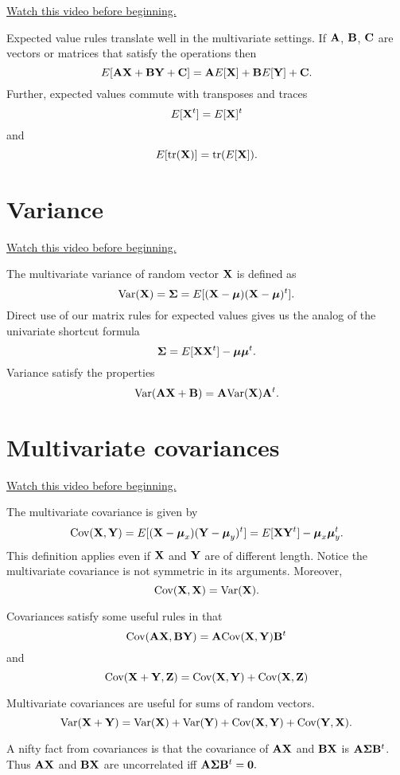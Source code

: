 \href{https://www.youtube.com/watch?v=GgNUixhQ6oI&list=PLpl-gQkQivXhdgUCdaUQcdb31CRe8Mm2y&index=39}{Watch this video before beginning.}

Expected value rules translate well in the multivariate settings.
If $\mathbf{A}$, $\mathbf{B}$, $\mathbf{C}$ are vectors or matrices that satisfy the operations then 
$$
E[\mathbf{A} \mathbf{X} + \mathbf{B} \mathbf{Y} + \mathbf{C}] = \mathbf{A} E[\mathbf{X}] + \mathbf{B} E[\mathbf{Y}] + \mathbf{C}.
$$
Further, expected values commute with transposes and traces
$$
E[\mathbf{X}^t] = E[\mathbf{X}]^t
$$
and 
$$
E[\mbox{tr}(\mathbf{X})] = \mbox{tr}(E[\mathbf{X}]).
$$

\section{Variance}

\href{https://www.youtube.com/watch?v=Z5L0dU6Chmc&index=40&list=PLpl-gQkQivXhdgUCdaUQcdb31CRe8Mm2y}{Watch this video before beginning.}

The multivariate variance of random vector $\mathbf{X}$ is defined as 
$$
\mbox{Var}(\mathbf{X}) = \boldsymbol{\Sigma} = E[(\mathbf{X} - \boldsymbol{\mu})(\mathbf{X} - \boldsymbol{\mu})^t].
$$
Direct use of our matrix rules for expected values gives us the
analog of the univariate shortcut formula
$$
\boldsymbol{\Sigma} = E[\mathbf{X}\mathbf{X}^t] - \boldsymbol{\mu} \boldsymbol{\mu}^t.
$$
Variance satisfy the properties 
$$
\mbox{Var}(\mathbf{A} \mathbf{X} + \mathbf{B}) = \mathbf{A} \mbox{Var}(\mathbf{X}) \mathbf{A}^t.
$$

\section{Multivariate covariances}

\href{https://www.youtube.com/watch?v=mddVO0zW64U&index=41&list=PLpl-gQkQivXhdgUCdaUQcdb31CRe8Mm2y}{Watch this video before beginning.}

The multivariate covariance is given by 
$$
\mbox{Cov}(\mathbf{X}, \mathbf{Y}) = E[(\mathbf{X} - \boldsymbol{\mu}_x)(\mathbf{Y} - \boldsymbol{\mu}_y)^t]
= E[\mathbf{X} \mathbf{Y}^t] - \boldsymbol{\mu}_x \boldsymbol{\mu}_y^t.
$$
This definition applies even if $\mathbf{X}$ and $\mathbf{Y}$ are of different length.
Notice the multivariate covariance is not symmetric in its arguments. 
Moreover, 
$$
\mbox{Cov}(\mathbf{X}, \mathbf{X}) = \mbox{Var}(\mathbf{X}).
$$

Covariances satisfy some useful rules in that
$$
\mbox{Cov}(\mathbf{A} \mathbf{X}, \mathbf{B} \mathbf{Y}) = \mathbf{A} \mbox{Cov}(\mathbf{X}, \mathbf{Y}) \mathbf{B}^t
$$
and
$$
\mbox{Cov}(\mathbf{X} + \mathbf{Y}, \mathbf{Z}) = \mbox{Cov}(\mathbf{X}, \mathbf{Y}) + \mbox{Cov}(\mathbf{X}, \mathbf{Z})
$$

Multivariate covariances are useful for sums of random vectors. 
$$
\mbox{Var}(\mathbf{X} + \mathbf{Y}) = \mbox{Var}(\mathbf{X}) + \mbox{Var}(\mathbf{Y}) + \mbox{Cov}(\mathbf{X}, \mathbf{Y}) + \mbox{Cov}(\mathbf{Y}, \mathbf{X}).
$$

A nifty fact from covariances is that the covariance of $\mathbf{A} \mathbf{X}$ and
$\mathbf{B} \mathbf{X}$ is $\mathbf{A} \boldsymbol{\Sigma} \mathbf{B}^t$. Thus $\mathbf{A} \mathbf{X}$ and $\mathbf{B} \mathbf{X}$ 
are uncorrelated iff $\mathbf{A} \boldsymbol{\Sigma} \mathbf{B}^t = \mathbf{0}.$

